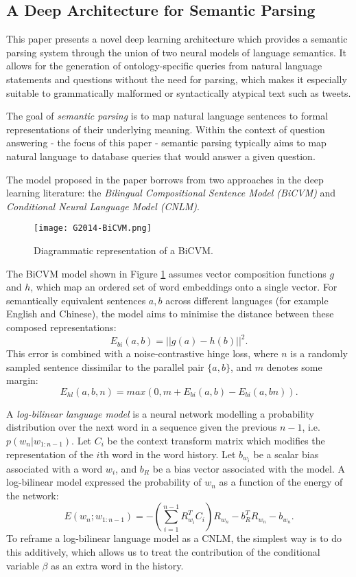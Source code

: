 \subsection{A Deep Architecture for Semantic Parsing \cite{Grefenstette2014}}

This paper presents a novel deep learning architecture which provides a semantic parsing system through the union of two neural models of language semantics. It allows for the generation of ontology-specific queries from natural language statements and questions without the need for parsing, which makes it especially suitable to grammatically malformed or syntactically atypical text such as tweets.

The goal of \emph{semantic parsing} is to map natural language sentences to formal representations of their underlying meaning. Within the context of question answering - the focus of this paper - semantic parsing typically aims to map natural language to database queries that would answer a given question.

The model proposed in the paper borrows from two approaches in the deep learning literature: the \emph{Bilingual Compositional Sentence Model (BiCVM)} and \emph{Conditional Neural Language Model (CNLM)}.

\begin{figure}[h]
  \centering
  \texttt{[image: G2014-BiCVM.png]}\\
  \caption{Diagrammatic representation of a BiCVM.}\label{fig:BiCVM}
\end{figure}

The BiCVM model shown in Figure \ref{fig:BiCVM} assumes vector composition functions $g$ and $h$, which map an ordered set of word embeddings onto a single vector. For semantically equivalent sentences $a, b$ across different languages (for example English and Chinese), the model aims to minimise the distance between these composed representations:
$$E_{bi}(a,b) = ||g(a) - h(b)||^2.$$
This error is combined with a noise-contrastive hinge loss, where $n$ is a randomly sampled sentence dissimilar to the parallel pair $\{a,b\}$, and $m$ denotes some margin:
$$E_{hl}(a,b,n) = max(0, m + E_{bi}(a,b) - E_{bi}(a,bn)).$$

A \emph{log-bilinear language model} is a neural network modelling a probability distribution over the next word in a sequence given the previous $n-1$, i.e. $p(w_n | w_{1:n-1})$. Let $C_i$ be the context transform matrix which modifies the representation of the $i$th word in the word history. Let $b_{w_i}$ be a scalar bias associated with a word $w_i$, and $b_R$ be a bias vector associated with the model. A log-bilinear model expressed the probability of $w_n$ as a function of the energy of the network:
$$E(w_n ; w_{1:n-1}) = -(\sum^{n-1}_{i=1}R_{w_i}^T C_i) R_{w_n} - b_R^T R_{w_n} - b_{w_n}.$$
To reframe a log-bilinear language model as a CNLM, the simplest way is to do this additively, which allows us to treat the contribution of the conditional variable $\beta$ as an extra word in the history.

